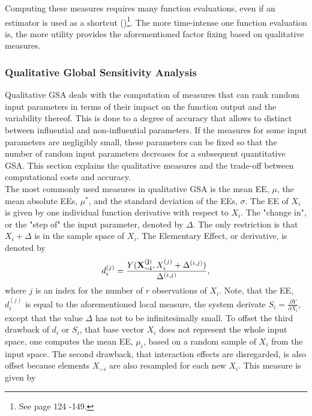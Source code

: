 \documentclass[a4paper,12pt]{article}
\begin{document}
\noindent
Computing these measures requires many function evaluations, even if an estimator is used as a shortcut (\cite{Saltelli.2004})\footnote{See page 124 -149.}. The more time-intense one function evaluation is, the more utility provides the aforementioned factor fixing based on qualitative measures. 


\subsubsection{Qualitative Global Sensitivity Analysis}


Qualitative GSA deals with the computation of measures that can rank random input parameters in terms of their impact on the function output and the variability thereof. This is done to a degree of accuracy that allows to distinct between influential and non-influential parameters. If the measures for some input parameters are negligibly small, these parameters can be fixed so that the number of random input parameters decreases for a subsequent quantitative GSA. This section explains the qualitative measures and the trade-off between computational costs and accuracy. \\

\noindent
The most commonly used measures in qualitative GSA is the mean EE, $\mu$, the mean absolute EEs, $\mu^*$, and the standard deviation of the EEs, $\sigma$. The EE of $X_i$ is given by one individual function derivative with respect to $X_i$. The "change in", or the "step of" the input parameter, denoted by $\Delta$. The only restriction is that $X_i + \Delta$ is in the sample space of $X_i$. The Elementary Effect, or derivative, is denoted by
\begin{align}
d_i^{(j)} =  \frac{Y(\bold{X_{\sim i}^{(j)}}, X_i^{(j)} + \Delta^{(i,j)})}{\Delta^{(i,j)}},
\end{align}
where $j$ is an index for the number of $r$ observations of $X_i$.
Note, that the EE, $d_i^{(j)}$ is equal to the aforementioned local measure, the system derivate $S_i = \frac{\partial Y}{\partial X_i}$, except that the value $\Delta$ has not to be infinitesimally small. To offset the third drawback of $d_i$ or $S_i$, that base vector $X_i$ does not represent the whole input space, one computes the mean EE, $\mu_i$, based on a random sample of $X_i$ from the input space. The second drawback, that interaction effects are disregarded, is also offset because elements $X_{\sim i}$ are also resampled for each new $X_i$. This measure is given by
\end{document}
